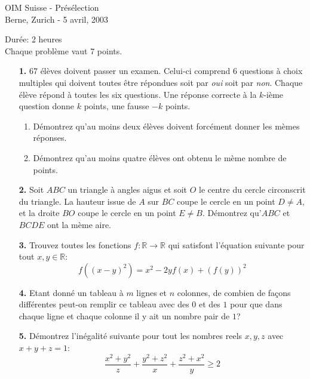 \documentclass[12pt]{article}
\begin{document}
\pagestyle{empty}
\newcommand{\wi}{\hspace{1pt} < \hspace{-6pt} ) \hspace{2pt}}

\begin{center}
{\huge OIM Suisse - Pr\'{e}s\'{e}lection} \\
\medskip Berne, Zurich - 5 avril, 2003
\end{center}
\vspace{8mm}
Dur\'{e}e: 2 heures\\
Chaque probl\`{e}me vaut 7 points.\\
\vspace{15mm}

\begin{enumerate}

\item[\textbf{1.}]67 \'{e}l\`{e}ves doivent passer un examen. Celui-ci
comprend 6 questions \`{a} choix multiples qui doivent toutes
\^{e}tre r\'{e}pondues soit par \textit{oui} soit par
\textit{non}. Chaque \'{e}l\`{e}ve r\'{e}pond \`{a} toutes les six
questions. Une r\'{e}ponse correcte \`{a} la $k$-i\`{e}me question
donne $k$ points, une fausse $-k$ points.
\begin{enumerate}
\item D\'{e}montrez qu'au moins deux \'{e}l\`{e}ves doivent forc\'{e}ment donner les m\`{e}mes
r\'{e}ponses.
\item D\'{e}montrez qu'au moins quatre \'{e}l\`{e}ves ont obtenu le m\`{e}me nombre
de points.
\end{enumerate}

\bigskip

\item[\textbf{2.}] Soit $ABC$ un triangle \`{a} angles aigus et soit $O$ le
centre du cercle circonscrit du triangle. La hauteur issue de $A$
sur $BC$ coupe le cercle en un point $D \neq A$, et la droite $BO$
coupe le cercle en un point $E \neq B$. D\'{e}montrez qu'$ABC$ et
$BCDE$ ont la m\`{e}me aire.

\bigskip

\item[\textbf{3.}] Trouvez toutes les fonctions $f: \mathbb{R} \rightarrow \mathbb{R}$
 qui satisfont  l'\'{e}quation suivante pour tout $x,y \in
 \mathbb{R}$:
\[f((x-y)^2)=x^2-2yf(x)+(f(y))^2\]

\bigskip

\item[\textbf{4.}] Etant donn\'{e} un tableau \`{a} $m$ lignes et $n$
colonnes, de combien de fa\c{c}ons diff\'{e}rentes peut-on remplir
ce tableau avec des $0$ et des $1$ pour que dans chaque ligne et
chaque colonne il y ait un nombre pair de $1$?

\bigskip

\item[\textbf{5.}] D\'{e}montrez l'in\'{e}galit\'{e} suivante pour tout les nombres reels
 $x,y,z$ avec $x+y+z=1$:
\[\frac{x^2+y^2}{z}+\frac{y^2+z^2}{x}+\frac{z^2+x^2}{y}\geq 2\]


\end{enumerate}
\end{document}
